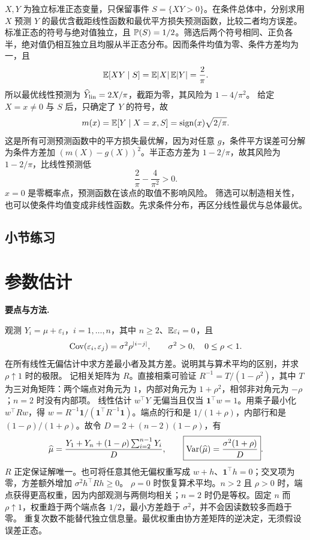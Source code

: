 $X,Y$ 为独立标准正态变量，只保留事件 $S=\{XY>0\}$。在条件总体中，分别求用 $X$ 预测 $Y$ 的最优含截距线性函数和最优平方损失预测函数，比较二者均方误差。
\solution 标准正态的符号与绝对值独立，且 $\mathbb{P}(S)=1/2$。筛选后两个符号相同、正负各半，绝对值仍相互独立且均服从半正态分布。因而条件均值为零、条件方差均为一，且
\[
 \mathbb{E}[XY\mid S]=\mathbb{E}|X|\,\mathbb{E}|Y|=\frac2\pi.
\]
所以最优线性预测为 $\widehat Y_{\rm lin}=2X/\pi$，截距为零，其风险为 $1-4/\pi^2$。
给定 $X=x\ne0$ 与 $S$ 后，只确定了 $Y$ 的符号，故
\[
 m(x)=\mathbb{E}[Y\mid X=x,S]
 =\operatorname{sign}(x)\sqrt{2/\pi}.
\]
这是所有可测预测函数中的平方损失最优解，因为对任意 $g$，条件平方误差可分解为条件方差加 $(m(X)-g(X))^2$。半正态方差为 $1-2/\pi$，故其风险为 $1-2/\pi$，比线性预测低
\[
 \frac2\pi-\frac4{\pi^2}>0.
\]
$x=0$ 是零概率点，预测函数在该点的取值不影响风险。
\insight 筛选可以制造相关性，也可以使条件均值变成非线性函数。先求条件分布，再区分线性最优与总体最优。

\par{}
\subsection*{小节练习}



\section{参数估计}
\noindent\textbf{要点与方法.}\enspace



观测 $Y_i=\mu+\varepsilon_i$，$i=1,\ldots,n$，其中 $n\ge2$、$\mathbb{E}\varepsilon_i=0$，且
\[
 \operatorname{Cov}(\varepsilon_i,\varepsilon_j)=\sigma^2\rho^{|i-j|},
 \qquad \sigma^2>0,\quad0\le\rho<1.
\]
在所有线性无偏估计中求方差最小者及其方差。说明其与算术平均的区别，并求 $\rho\uparrow1$ 时的极限。
\solution 记相关矩阵为 $R$。直接相乘可验证 $R^{-1}=T/(1-\rho^2)$，其中 $T$ 为三对角矩阵：两个端点对角元为 $1$，内部对角元为 $1+\rho^2$，相邻非对角元为 $-\rho$；$n=2$ 时没有内部项。
线性估计 $w^\top Y$ 无偏当且仅当 $\mathbf1^\top w=1$。用乘子最小化 $w^\top Rw$，得 $w=R^{-1}\mathbf1/(\mathbf1^\top R^{-1}\mathbf1)$。端点的行和是 $1/(1+\rho)$，内部行和是 $(1-\rho)/(1+\rho)$。故令 $D=2+(n-2)(1-\rho)$，有
\[
 \widehat\mu=\frac{Y_1+Y_n+(1-\rho)\sum_{i=2}^{n-1}Y_i}{D},
 \qquad
 \boxed{\operatorname{Var}(\widehat\mu)=\frac{\sigma^2(1+\rho)}{D}}.
\]
$R$ 正定保证解唯一。也可将任意其他无偏权重写成 $w+h$、$\mathbf1^\top h=0$；交叉项为零，方差额外增加 $\sigma^2h^\top Rh\ge0$。
$\rho=0$ 时恢复算术平均。$n>2$ 且 $\rho>0$ 时，端点获得更高权重，因为内部观测与两侧均相关；$n=2$ 时仍是等权。固定 $n$ 而 $\rho\uparrow1$，权重趋于两个端点各 $1/2$，最小方差趋于 $\sigma^2$，并不会因读数较多而趋于零。
\insight 重复次数不能替代独立信息量。最优权重由协方差矩阵的逆决定，无须假设误差正态。

